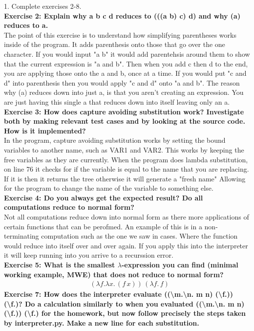 \documentclass{article}
\theoremstyle{theorem}
\theoremstyle{definition}
\theoremstyle{remark}
\begin{document}
1. Complete exercises 2-8. \\
\textbf{Exercise 2: Explain why a b c d reduces to (((a b) c) d) and why (a) reduces to a.} \\
The point of this exercise is to understand how simplifying parentheses works inside of the program. It adds parenthesis onto those that 
go over the one character. If you would input "a b" it would add parentehsis around them to show that the current expression is "a and b". Then when you add c then d to the end, 
you are applying those onto the a and b, once at a time. If you would put "c and d" into parenthesis then you would apply "c and d" onto "a and b".
The reason why (a) reduces down into just a, is that you aren't creating an expression. You are just having this single a that reduces down into itself leaving only an a.\\
\textbf{Exercise 3: How does capture avoiding substitution work? Investigate both by making relevant test cases and by looking at the source code. How is it implemented?}\\
In the program, capture avoiding substitution works by setting the bound variables to another name, such as VAR1 and VAR2. This works by keeping the free variables as they are currently.
When the program does lambda substitution, on line 76 it checks for if the variable is equal to the name that you are replacing. If it is then it returns the tree otherwise it will generate a "fresh name"
Allowing for the program to change the name of the variable to something else. \\
\textbf{Exercise 4: Do you always get the expected result? Do all computations reduce to normal form?}\\
Not all computations reduce down into normal form as there more applications of certain functions that can be perofmed. An example of this is in a non-terminating computation such as the one we saw in cases. 
Where the function would reduce into itself over and over again. If you apply this into the interpreter it will keep running into you arrive to a recurssion error. \\
\textbf{Exercise 5: What is the smallest $\lambda$-expression you can find (minimal working example, MWE) that does not reduce to normal form?}\\
\begin{align*}
  &(\lambda f.\lambda x. \, (f \, x)) \, (\lambda f. \, f)
\end{align*}
\textbf{Exercise 7: How does the interpreter evaluate ((\textbackslash m.\textbackslash n. m n) (\textbackslash f.)) (\textbackslash f.)? Do a calculation similarly to when you evaluated ((\textbackslash m.\textbackslash n. m n) (\textbackslash f.)) (\textbackslash f.) for the homework, but now follow precisely the steps taken by interpreter.py. Make a new line for each substitution.} \\
\end{document}
